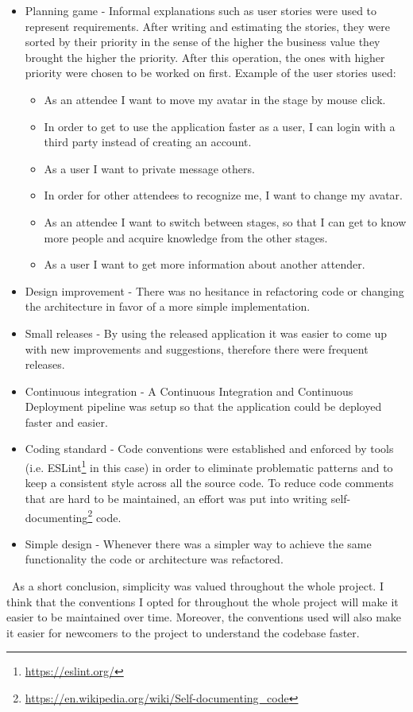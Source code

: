 \begin{itemize}
	\item Planning game - Informal explanations such as user stories were used to represent requirements. After writing and estimating the stories, they were sorted by their priority in the sense of the higher the business value they brought the higher the priority. After this operation, the ones with higher priority were chosen to be worked on first. Example of the user stories used:

	\begin{itemize}
		\item As an attendee I want to move my avatar in the stage by mouse click.
		\item In order to get to use the application faster as a user, I can login with a third party instead of creating an account.
		\item As a user I want to private message others.
		\item In order for other attendees to recognize me, I want to change my avatar.
		\item As an attendee I want to switch between stages, so that I can get to know more people and acquire knowledge from the other stages.
		\item As a user I want to get more information about another attender.
	\end{itemize}
	
	\item Design improvement - There was no hesitance in refactoring code or changing the architecture in favor of a more simple implementation.
	\item Small releases - By using the released application it was easier to come up with new improvements and suggestions, therefore there were frequent releases.
	\item Continuous integration - A Continuous Integration and Continuous Deployment pipeline was setup so that the application could be deployed faster and easier.
	\item Coding standard - Code conventions were established and enforced by tools (i.e. ESLint\footnote{\href{https://eslint.org/}{https://eslint.org/}} in this case) in order to eliminate problematic patterns and to keep a consistent style across all the source code. To reduce code comments that are hard to be maintained, an effort was put into writing self-documenting\footnote{\href{https://en.wikipedia.org/wiki/Self-documenting\_code}{https://en.wikipedia.org/wiki/Self-documenting\_code}} code.
	\item Simple design - Whenever there was a simpler way to achieve the same functionality the code or architecture was refactored.
\end{itemize} 
\
As a short conclusion, simplicity was valued throughout the whole project. I think that the conventions I opted for throughout the whole project will make it easier to be maintained over time. Moreover, the conventions used will also make it easier for newcomers to the project to understand the codebase faster.
